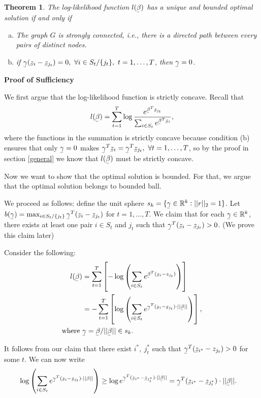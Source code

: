 \documentclass[11pt]{article}
\newcommand{\ubar}[1]{\underaccent{\bar}{#1}}
\newtheorem{theorem}{Theorem}
\begin{document}
\begin{theorem}
The log-likelihood function $l(\ubar \beta)$ has a unique and bounded optimal solution if and only if
\begin{enumerate}[(a)]
\item The graph $G$ is strongly connected, i.e., there is a directed path between every pairs of distinct nodes.
\item if $\ubar \gamma(\ubar z_i - \ubar z_{j_t})=0, \  \forall i \in S_t/\{j_t\}, \ t=1,\ldots,T$, then $\ubar \gamma=0$.
\end{enumerate}
\end{theorem}

{\bf Proof of Sufficiency}

We first argue that the log-likelihood function is strictly concave. Recall that
$$l(\ubar \beta)=\sum_{t=1}^T \log \frac{e^{\ubar \beta^T \ubar z_{j_t}}}{\sum_{i \in S_t}e^{\ubar \beta^T \ubar z_i}},$$
where the functions in the summation is strictly concave because condition (b) ensures that only $\ubar \gamma=0$ makes $\ubar \gamma^T \ubar z_i=\ubar \gamma^T \ubar z_{j_t}, \ \forall t=1,\ldots,T$, so by the proof in section \ref{general} we know that $l(\ubar \beta)$ must be strictly concave.

Now we want to show that the optimal solution is bounded. For that, we argue that the optimal solution belongs to bounded ball.

We proceed as follows: define the unit sphere $s_k=\{\ubar \gamma \in \mathbb{R}^k: ||r||_2=1\}$. Let $b(\ubar \gamma)=\max_{i\in S_t/\{j_t\}} \ubar \gamma^T(\ubar z_{i}-\ubar z_{j_t})$ for $t=1,\ldots,T$. We claim that for each $\ubar \gamma\in \mathbb{R}^k$, there exists at least one pair $i\in S_t$ and $j_t$ such that $\ubar \gamma^T(\ubar z_i - \ubar z_{j_t})>0$. (We prove this claim later)

Consider the following:
\begin{align*}
l(\ubar \beta)&=\sum_{t=1}^T \left[ -\log \left(\sum_{i \in S_t}e^{\ubar \beta^T (\ubar z_i-z_{j_t})}\right) \right]\\
&=-\sum_{t=1}^T \left[ \log \left(\sum_{i \in S_t}e^{\ubar \gamma^T (\ubar z_i-\ubar z_{j_t})\cdot ||\ubar \beta||}\right) \right],\\
\text{where }& \ubar \gamma=\ubar \beta/||\ubar \beta||\in s_k.
\end{align*}

It follows from our claim that there exist $i^*, \ j_t^*$ such that $\ubar \gamma^T(\ubar z_{i^*}-z_{j_t})>0$ for some $t$. We can now write
\begin{align*}
\log\left( \sum_{i\in S_t} e^{\ubar \gamma^T (\ubar z_i-\ubar z_{j_t})\cdot ||\beta||}  \right)&\geq \log e^{\ubar \gamma^T(\ubar z_{i^*}-\ubar z_{j^*_t})\cdot ||\ubar \beta||}=\ubar \gamma^T(\ubar z_{i^*}- \ubar z_{j^*_t})\cdot ||\ubar \beta||.
\end{align*}
\end{document}
